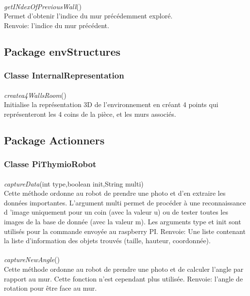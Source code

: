\documentclass[12pt]{report}
\begin{document}
\paragraph{}
\textit{getINdexOfPreviousWall}()\\
Permet d'obtenir l'indice du mur précédemment exploré.\\
Renvoie: l'indice du mur précédent.

\subsection{Package envStructures}

\subsubsection{Classe InternalRepresentation}

\paragraph{}
\textit{createa4WallsRoom}()\\
Initialise la représentation 3D de l'environnement en créant 4 points qui représenteront les 4 coins de la pièce, et les murs associés.

\subsection{Package Actionners}

\subsubsection{Classe PiThymioRobot}

\paragraph{}
\textit{captureData}(int type,boolean init,String multi)\\
Cette méthode ordonne au robot de prendre une photo et d'en extraire les données importantes. L'argument multi permet de procéder à une reconnaissance d 'image uniquement pour un coin (avec la valeur u) ou de tester toutes les images de la base de donnée (avec la valeur m). Les arguments type et init sont utilisés pour la commande envoyée au raspberry PI.
Renvoie: Une liste contenant la liste d'information des objets trouvés (taille, hauteur, coordonnée).

\paragraph{}
\textit{captureNewAngle}()\\
Cette méthode ordonne au robot de prendre une photo et de calculer l'angle par rapport au mur. Cette fonction n'est cependant plus utilisée.
Renvoie: l'angle de rotation pour être face au mur.
\end{document}
